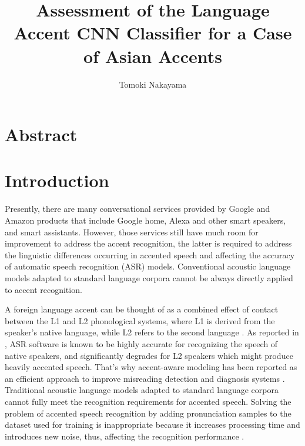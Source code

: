 \documentclass[ams]{U-AizuGT}
\author{Tomoki Nakayama}
\title{Assessment of the Language Accent CNN Classifier for a Case of Asian Accents}
\begin{document}
\maketitle

\section*{Abstract}

\section{Introduction}
Presently, there are many conversational services provided by Google and Amazon products that include Google home, Alexa and other smart speakers, and smart assistants. However, those services still have much room for improvement to address the accent recognition, the latter is required to address the linguistic differences occurring in accented speech and affecting the accuracy of automatic speech recognition (ASR) models.
Conventional acoustic language models adapted to standard language corpora cannot be always directly applied to accent recognition.

A foreign language accent can be thought of as a combined effect of contact between the L1 and L2 phonological systems, where L1 is derived from the speaker's native language, while L2 refers to the second language \cite{Veranika:lang, Boula:the}. As reported in \cite{Rogerson:com}, ASR software is known to be highly accurate for recognizing the speech of native speakers, and significantly degrades for L2 speakers which might produce heavily accented speech. That's why accent-aware modeling has been reported as an efficient approach to improve misreading detection and diagnosis systems \cite{Jiang:tow,Algabri:mis}. Traditional acoustic language models adapted to standard language corpora cannot fully meet the recognition requirements for accented speech. Solving the problem of accented speech recognition by adding pronunciation samples to the dataset used for training is inappropriate because it increases processing time and introduces new noise, thus, affecting the recognition performance \cite{Deshpande:acc}. 
\end{document}
